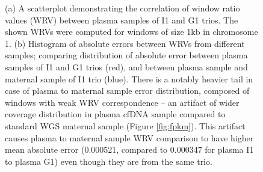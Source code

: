 \begin{figure}
\caption{(a) A scatterplot demonstrating the correlation of window ratio values (WRV) between plasma samples of I1 and G1 trios. The shown WRVs were computed for windows of size 1kb in chromosome 1. (b) Histogram of absolute errors between WRVs from different samples; comparing distribution of absolute error between plasma samples of I1 and G1 trios (red), and between plasma sample and maternal sample of I1 trio (blue). There is a notably heavier tail in case of plasma to maternal sample error distribution, composed of windows with weak WRV correspondence -- an artifact of wider coverage distribution in plasma cfDNA sample compared to standard WGS maternal sample (Figure \ref{fig:fpkm}). This artifact causes plasma to maternal sample WRV comparison to have higher mean absolute error (0.000521, compared to 0.000347 for plasma I1 to plasma G1) even though they are from the same trio. }
\label{fig:wrv}
\hspace*{10pt}
\end{figure}
